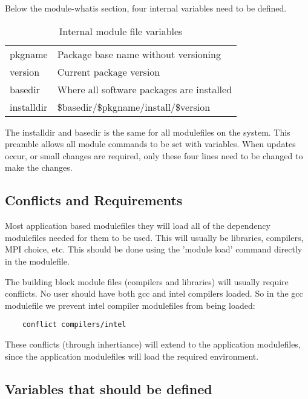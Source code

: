 \documentclass{article}
\begin{document}
Below the module-whatis section, four internal variables need to be defined.

\begin{center}
\begin{table}[h]
\begin{tabular}{ll}
		pkgname	& Package base name without versioning \\
		version & Current package version \\
		basedir & Where all software packages are installed \\
		installdir & \${basedir}/\${pkgname}/install/\${version} \\
\end{tabular}
\caption {Internal module file variables}
\end{table}
\end{center}

The installdir and basedir is the same for all modulefiles on the system.  This 
preamble allows all module commands to be set with variables.  When updates 
occur, or small changes are required, only these four lines need to be changed 
to make the changes.

\subsection{Conflicts and Requirements}

Most application based modulefiles they will load all of the dependency 
modulefiles needed for them to be used.  This will usually be libraries, 
compilers, MPI choice, etc.  This should be done using the 'module load' 
command directly in the modulefile.

The building block module files (compilers and libraries) will usually require 
conflicts.  No user should have both gcc and intel compilers loaded.  So in the 
gcc modulefile we prevent intel compiler modulefiles from being loaded:

\begin{center}
\begin{verbatim}
	conflict compilers/intel
\end{verbatim}
\end{center}

\noindent These conflicts (through inhertiance) will extend to the application 
modulefiles, since the application modulefiles will load the required 
environment.

\subsection{Variables that should be defined}
\end{document}
